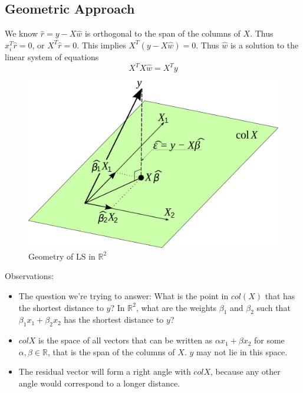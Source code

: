 \documentclass[12pt]{article}
\theoremstyle{definition}
\newcommand{\R}{\mathbb{R}}
\begin{document}
\subsection{Geometric Approach}

We know $\hat r = y - X \hat w$ is orthogonal to the span of the columns of $X$. Thus $x_i^T \hat r = 0$, or $X^T \hat r = 0$. This implies $X^T (y - X \hat w) = 0$. Thus $\hat w$ is a solution to the linear system of equations
\begin{equation}
	X^T X \hat w = X^T y
\end{equation}

\begin{figure}[H]
	\begin{center}
		\includegraphics[scale=.1]{ls_geometry.png}
	\end{center}
	\caption{Geometry of LS in $\R^2$}
\end{figure}

Observations:
\begin{itemize}
	\item The question we're trying to answer: What is the point in $col(X)$ that has the shortest distance to $y$? In $\R^2$, what are the weights $\beta_1$ and $\beta_2$ such that $\beta_1 x_1 + \beta_2 x_2$ has the shortest distance to $y$?
	\item $col X$ is the space of all vectors that can be written as $\alpha x_1 + \beta x_2$ for some $\alpha, \beta \in \R$, that is the span of the columns of $X$. $y$ may not lie in this space. 
	\item The residual vector will form a right angle with $col X$, because any other angle would correspond to a longer distance. 
\end{itemize}
\end{document}
